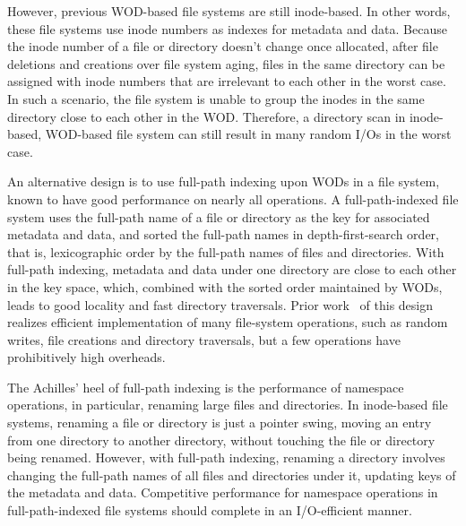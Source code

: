 However, previous WOD-based file systems are still inode-based.
In other words, these file systems use inode numbers as indexes for
metadata and data.
Because the inode number of a file or directory doesn't change once allocated,
after file deletions and creations over file system aging,
files in the same directory can be assigned with inode numbers that are
irrelevant to each other in the worst case.
In such a scenario, the file system is unable to group the inodes in the
same directory close to each other in the WOD.
Therefore, a directory scan in inode-based, WOD-based file system can still
result in many random I/Os in the worst case.

An alternative design is to use full-path indexing upon WODs in a file system,
known to have good performance on nearly all operations.
A full-path-indexed file system uses the full-path name of a file or directory as
the key for associated metadata and data,
and sorted the full-path names in depth-first-search order,
that is, lexicographic order by the full-path names of files and directories.
With full-path indexing, metadata and data under one directory are close to each
other in the key space, which, combined with the sorted order maintained by
WODs, leads to good locality and fast directory traversals.
Prior work~\citep{betrfs1,betrfs1tos,betrfs2,betrfs2tos,betrfs3} of this design
realizes efficient implementation of many file-system operations, such as random
writes, file creations and directory traversals,
but a few operations have prohibitively high overheads.

The Achilles' heel of full-path indexing is the performance of namespace
operations, in particular, renaming large files and directories.
In inode-based file systems,
renaming a file or directory is just a pointer swing,
moving an entry from one directory to another directory,
without touching the file or directory being renamed.
However, with full-path indexing, renaming a directory involves changing the
full-path names of all files and directories under it,
updating keys of the metadata and data.
Competitive performance for namespace operations in full-path-indexed file
systems should complete in an I/O-efficient manner.

